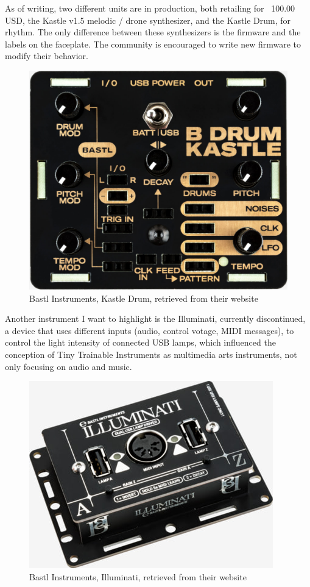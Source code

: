 As of writing, two different units are in production, both retailing for ~100.00 USD, the Kastle v1.5 melodic / drone synthesizer, and the Kastle Drum, for rhythm. The only difference between these synthesizers is the firmware and the labels on the faceplate. The community is encouraged to write new firmware to modify their behavior. 

\begin{figure}[h]
  \centering
  \includegraphics[width=0.75\linewidth,height=0.25\textheight,keepaspectratio]{images/bastl-kastle-drum.jpg}
  \caption{Bastl Instruments, Kastle Drum, retrieved from their website}
  \label{fig:bastl-kastle-drum}
\end{figure}

Another instrument I want to highlight is the Illuminati, currently discontinued, a device that uses different inputs (audio, control votage, MIDI messages), to control the light intensity of connected USB lamps, which influenced the conception of Tiny Trainable Instruments as multimedia arts instruments, not only focusing on audio and music.

\begin{figure}[h]
  \centering
  \includegraphics[width=0.75\linewidth,height=0.25\textheight,keepaspectratio]{images/bastl-illuminati.jpg}
  \caption{Bastl Instruments, Illuminati, retrieved from their website}
  \label{fig:bastl-illuminati}
\end{figure}


